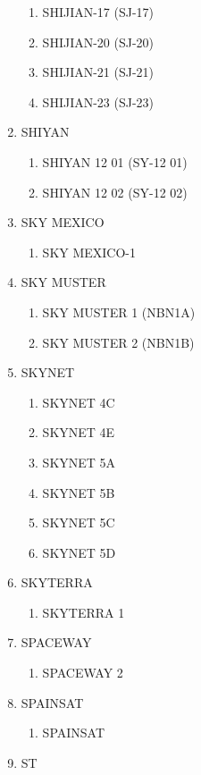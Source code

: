 \begin{multicols}{2}
\begin{enumerate}
  \begin{enumerate}
    \item SHIJIAN-17 (SJ-17)
    \item SHIJIAN-20 (SJ-20)
    \item SHIJIAN-21 (SJ-21)
    \item SHIJIAN-23 (SJ-23)
  \end{enumerate}
  \item SHIYAN
  \begin{enumerate}
    \item SHIYAN 12 01 (SY-12 01)
    \item SHIYAN 12 02 (SY-12 02)
  \end{enumerate}
  \item SKY MEXICO
  \begin{enumerate}
    \item SKY MEXICO-1
  \end{enumerate}
  \item SKY MUSTER
  \begin{enumerate}
    \item SKY MUSTER 1 (NBN1A)
    \item SKY MUSTER 2 (NBN1B)
  \end{enumerate}
  \item SKYNET
  \begin{enumerate}
    \item SKYNET 4C
    \item SKYNET 4E
    \item SKYNET 5A
    \item SKYNET 5B
    \item SKYNET 5C
    \item SKYNET 5D
  \end{enumerate}
  \item SKYTERRA
  \begin{enumerate}
    \item SKYTERRA 1
  \end{enumerate}
  \item SPACEWAY
  \begin{enumerate}
    \item SPACEWAY 2
  \end{enumerate}
  \item SPAINSAT
  \begin{enumerate}
    \item SPAINSAT
  \end{enumerate}
  \item ST
  \begin{enumerate}

\end{enumerate}
\end{enumerate}
\end{multicols}
